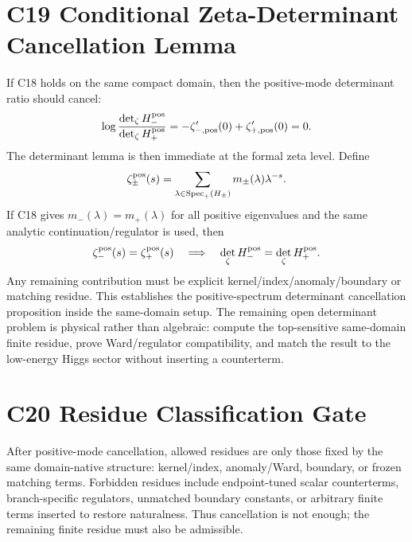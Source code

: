 \documentclass[11pt]{article}
\begin{document}
\section{C19 Conditional Zeta-Determinant Cancellation Lemma}
If C18 holds on the same compact domain, then the positive-mode determinant
ratio should cancel:
\begin{equation}
\log\frac{\det_\zeta H_-^{\rm pos}}{\det_\zeta H_+^{\rm pos}}
=-\zeta_{-,{\rm pos}}'(0)+\zeta_{+,{\rm pos}}'(0)=0.
\end{equation}
The determinant lemma is then immediate at the formal zeta level.  Define
\begin{equation}
\zeta_\pm^{\rm pos}(s)=\sum_{\lambda\in{\rm Spec}_+(H_\pm)}
m_\pm(\lambda)\lambda^{-s}.
\end{equation}
If C18 gives $m_-(\lambda)=m_+(\lambda)$ for all positive eigenvalues and the
same analytic continuation/regulator is used, then
\begin{equation}
\zeta_-^{\rm pos}(s)=\zeta_+^{\rm pos}(s)
\quad\Longrightarrow\quad
\det_\zeta H_-^{\rm pos}=\det_\zeta H_+^{\rm pos} .
\end{equation}
Any remaining contribution must be explicit kernel/index/anomaly/boundary or
matching residue.  This establishes the positive-spectrum determinant
cancellation proposition inside the same-domain setup.  The remaining open
determinant problem is physical rather than algebraic: compute the
top-sensitive same-domain finite residue, prove Ward/regulator compatibility,
and match the result to the low-energy Higgs sector without inserting a
counterterm.

\section{C20 Residue Classification Gate}
After positive-mode cancellation, allowed residues are only those fixed by the
same domain-native structure: kernel/index, anomaly/Ward, boundary, or frozen
matching terms.  Forbidden residues include endpoint-tuned scalar counterterms,
branch-specific regulators, unmatched boundary constants, or arbitrary finite
terms inserted to restore naturalness.  Thus cancellation is not enough; the
remaining finite residue must also be admissible.
\end{document}
